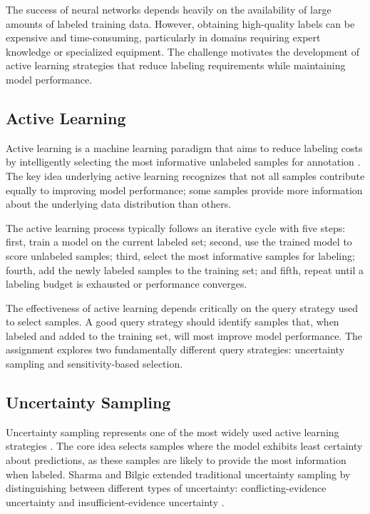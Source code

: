 \documentclass[conference]{IEEEtran}
\begin{document}
The success of neural networks depends heavily on the availability of large amounts of labeled training data. However, obtaining high-quality labels can be expensive and time-consuming, particularly in domains requiring expert knowledge or specialized equipment. The challenge motivates the development of active learning strategies that reduce labeling requirements while maintaining model performance.

\subsection{Active Learning}

Active learning is a machine learning paradigm that aims to reduce labeling costs by intelligently selecting the most informative unlabeled samples for annotation \cite{settles2009active}. The key idea underlying active learning recognizes that not all samples contribute equally to improving model performance; some samples provide more information about the underlying data distribution than others.

The active learning process typically follows an iterative cycle with five steps: first, train a model on the current labeled set; second, use the trained model to score unlabeled samples; third, select the most informative samples for labeling; fourth, add the newly labeled samples to the training set; and fifth, repeat until a labeling budget is exhausted or performance converges.

The effectiveness of active learning depends critically on the query strategy used to select samples. A good query strategy should identify samples that, when labeled and added to the training set, will most improve model performance. The assignment explores two fundamentally different query strategies: uncertainty sampling and sensitivity-based selection.

\subsection{Uncertainty Sampling}

Uncertainty sampling represents one of the most widely used active learning strategies \cite{lewis1994heterogeneous,settles2009active}. The core idea selects samples where the model exhibits least certainty about predictions, as these samples are likely to provide the most information when labeled. Sharma and Bilgic extended traditional uncertainty sampling by distinguishing between different types of uncertainty: conflicting-evidence uncertainty and insufficient-evidence uncertainty \cite{sharma2016evidence}.
\end{document}
